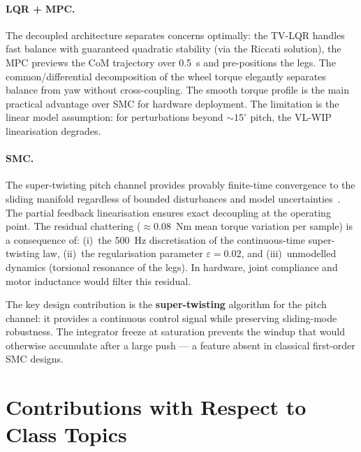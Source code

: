 \documentclass[11pt,a4paper]{article}
\newcommand{\dgr}{^{\circ}}
\begin{document}
\paragraph{LQR + MPC.}  The decoupled architecture separates concerns optimally: the
TV-LQR handles fast balance with guaranteed quadratic stability (via the Riccati solution),
the MPC previews the CoM trajectory over 0.5~s and pre-positions the legs.  The
common/differential decomposition of the wheel torque elegantly separates balance from yaw
without cross-coupling.  The smooth torque profile is the main practical advantage over SMC
for hardware deployment.  The limitation is the linear model assumption: for perturbations
beyond $\sim 15\dgr$ pitch, the VL-WIP linearisation degrades.

\paragraph{SMC.}  The super-twisting pitch channel provides provably finite-time
convergence to the sliding manifold regardless of bounded disturbances and model
uncertainties~\cite{moreno2012}.  The partial feedback linearisation ensures exact
decoupling at the operating point.  The residual chattering ($\approx 0.08$~Nm mean
torque variation per sample) is a consequence of: (i)~the 500~Hz discretisation of the
continuous-time super-twisting law, (ii)~the regularisation parameter $\varepsilon = 0.02$,
and (iii)~unmodelled dynamics (torsional resonance of the legs).  In hardware, joint
compliance and motor inductance would filter this residual.

The key design contribution is the \textbf{super-twisting} algorithm for the pitch channel:
it provides a continuous control signal while preserving sliding-mode robustness.  The
integrator freeze at saturation prevents the windup that would otherwise accumulate after a
large push --- a feature absent in classical first-order SMC designs.


\section{Contributions with Respect to Class Topics}
\label{sec:contributions}
\end{document}
